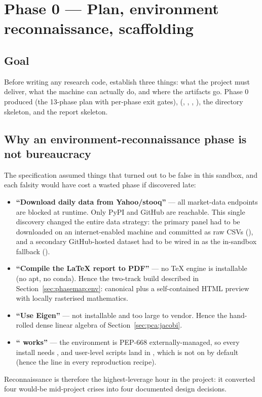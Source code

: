 \section{Phase 0 --- Plan, environment reconnaissance, scaffolding}
\label{ch:phase0}

\subsection{Goal}

Before writing any research code, establish three things: what the project must deliver,
what the machine can actually do, and where the artifacts go. Phase 0 produced
 (the 13-phase plan with per-phase exit gates), 
(, , , ), the
directory skeleton, and the report skeleton.

\subsection{Why an environment-reconnaissance phase is not bureaucracy}

The specification assumed things that turned out to be false in this sandbox, and each
falsity would have cost a wasted phase if discovered late:
\begin{itemize}
  \item \textbf{``Download daily data from Yahoo/stooq''} --- all market-data endpoints
    are blocked at runtime. Only PyPI and GitHub are reachable. This single discovery
    changed the entire data strategy: the primary panel had to be downloaded on an
    internet-enabled machine and committed as raw CSVs
    (), and a secondary GitHub-hosted dataset had to be
    wired in as the in-sandbox fallback ().
  \item \textbf{``Compile the LaTeX report to PDF''} --- no TeX engine is installable
    (no apt, no conda). Hence the two-track build described in
    Section~\ref{sec:phasemap:env}: canonical  plus a self-contained HTML
    preview with locally rasterised mathematics.
  \item \textbf{``Use Eigen''} --- not installable and too large to vendor. Hence the
    hand-rolled dense linear algebra of Section~\ref{sec:pca:jacobi}.
  \item \textbf{`` works''} --- the environment is PEP-668
    externally-managed, so every install needs , and
    user-level scripts land in , which is not on  by
    default (hence the  line in every reproduction recipe).
\end{itemize}
Reconnaissance is therefore the highest-leverage hour in the project: it converted four
would-be mid-project crises into four documented design decisions.


